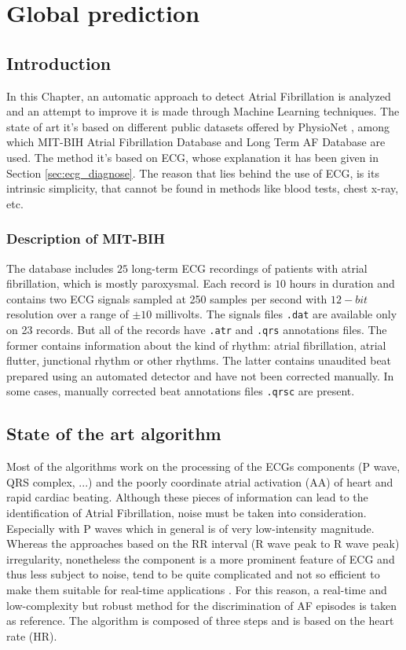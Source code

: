 \chapter{Global prediction}
\label{sec:global}

\section{Introduction}
\label{sec:global_introduction}
In this Chapter, an automatic approach to detect Atrial Fibrillation is analyzed and an attempt to improve it is made through Machine Learning techniques. The state of art it's based on different public datasets offered by PhysioNet \cite{physionet}, among which MIT-BIH Atrial Fibrillation Database \cite{afdb} and Long Term AF Database \cite{ltafdb} are used.
The method it's based on ECG, whose explanation it has been given in Section \ref{sec:ecg_diagnose}. The reason that lies behind the use of ECG, is its intrinsic simplicity, that cannot be found in methods like blood tests, chest x-ray, etc.

\subsection{Description of MIT-BIH}
The database includes $25$ long-term ECG recordings of patients with atrial fibrillation, which is mostly paroxysmal. Each record is $10$ hours in duration and contains two ECG signals sampled at 250 samples per second with $12-bit$ resolution over a range of $\pm 10$ millivolts. The signals files \verb|.dat| are available only on 23 records. But all of the records have \verb|.atr| and \verb|.qrs| annotations files. The former contains information about the kind of rhythm: atrial fibrillation, atrial flutter, junctional rhythm or other rhythms. The latter contains unaudited beat prepared using an automated detector and have not been corrected manually. In some cases, manually corrected beat annotations files \verb|.qrsc| are present.

\section{State of the art algorithm}
Most of the algorithms work on the processing of the ECGs components (P wave, QRS complex, ...) and the poorly coordinate atrial activation (AA) of heart and rapid cardiac beating. Although these pieces of information can lead to the identification of Atrial Fibrillation, noise must be taken into consideration. Especially with P waves which in general is of very low-intensity magnitude. Whereas the approaches based on the RR interval (R wave peak to R wave peak) irregularity, nonetheless the component is a more prominent feature of ECG and thus less subject to noise, tend to be quite complicated and not so efficient to make them suitable for real-time applications \cite[p. 2]{zhou2015}. For this reason, a real-time and low-complexity but robust method for the discrimination of AF episodes is taken as reference. The algorithm is composed of three steps and is based on the heart rate (HR).


